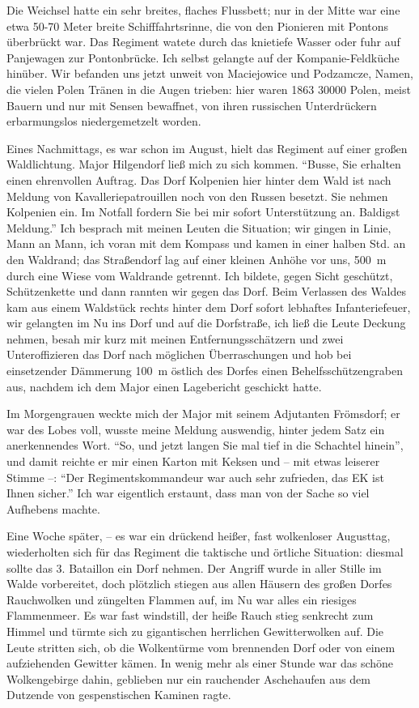 Die Weichsel hatte ein sehr breites, flaches Flussbett; nur in der Mitte war eine etwa 50-70 Meter breite Schifffahrtsrinne, die von den Pionieren mit Pontons überbrückt war. Das Regiment watete durch das knietiefe Wasser oder fuhr auf Panjewagen zur Pontonbrücke. Ich selbst gelangte auf der Kompanie-Feldküche hinüber. Wir befanden uns jetzt unweit von Maciejowice und Podzamcze, Namen, die vielen Polen Tränen in die Augen trieben: hier waren 1863 \num{30000} Polen, meist Bauern und nur mit Sensen bewaffnet, von ihren russischen Unterdrückern erbarmungslos niedergemetzelt worden.

Eines Nachmittags, es war schon im August, hielt das Regiment auf einer großen Waldlichtung. Major Hilgendorf ließ mich zu sich kommen. \enquote{Busse, Sie erhalten einen ehrenvollen Auftrag. Das Dorf Kolpenien hier hinter dem Wald ist nach Meldung von Kavalleriepatrouillen noch von den Russen besetzt. Sie nehmen Kolpenien ein. Im Notfall fordern Sie bei mir sofort Unterstützung an. Baldigst Meldung.} Ich besprach mit meinen Leuten die Situation; wir gingen in Linie, Mann an Mann, ich voran mit dem Kompass und kamen in einer halben Std. an den Waldrand; das Straßendorf lag auf einer kleinen Anhöhe vor uns, 500~m durch eine Wiese vom Waldrande getrennt. Ich bildete, gegen Sicht geschützt, Schützenkette und dann rannten wir gegen das Dorf. Beim Verlassen des Waldes kam aus einem Waldstück rechts hinter dem Dorf sofort lebhaftes Infanteriefeuer, wir gelangten im Nu ins Dorf und auf die Dorfstraße, ich ließ die Leute Deckung nehmen, besah mir kurz mit meinen Entfernungsschätzern und zwei Unteroffizieren das Dorf nach möglichen Überraschungen und hob bei einsetzender Dämmerung 100~m östlich des Dorfes einen Behelfsschützengraben aus, nachdem ich dem Major einen Lagebericht geschickt hatte.

Im Morgengrauen weckte mich der Major mit seinem Adjutanten Frömsdorf; er war des Lobes voll, wusste meine Meldung auswendig, hinter jedem Satz ein anerkennendes Wort. \enquote{So, und jetzt langen Sie mal tief in die Schachtel hinein}, und damit reichte er mir einen Karton mit Keksen und -- mit etwas leiserer Stimme --: \enquote{Der Regimentskommandeur war auch sehr zufrieden, das EK ist Ihnen sicher.} Ich war eigentlich erstaunt, dass man von der Sache so viel Aufhebens machte.

Eine Woche später, -- es war ein drückend heißer, fast wolkenloser Augusttag, wiederholten sich für das Regiment die taktische und örtliche Situation: diesmal sollte das 3. Bataillon ein Dorf nehmen. Der Angriff wurde in aller Stille im Walde vorbereitet, doch plötzlich stiegen aus allen Häusern des großen Dorfes Rauchwolken und züngelten Flammen auf, im Nu war alles ein riesiges Flammenmeer. Es war fast windstill, der heiße Rauch stieg senkrecht zum Himmel und türmte sich zu gigantischen herrlichen Gewitterwolken auf. Die Leute stritten sich, ob die Wolkentürme vom brennenden Dorf oder von einem aufziehenden Gewitter kämen. In wenig mehr als einer Stunde war das schöne Wolkengebirge dahin, geblieben nur ein rauchender Aschehaufen aus dem Dutzende von gespenstischen Kaminen ragte.

